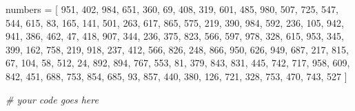 \documentclass[11pt]{article}
\newenvironment{Shaded}{}{}
\newcommand{\DecValTok}[1]{\textcolor[rgb]{0.25,0.63,0.44}{{#1}}}
\newcommand{\CommentTok}[1]{\textcolor[rgb]{0.38,0.63,0.69}{\textit{{#1}}}}
\newcommand{\NormalTok}[1]{{#1}}
\newcommand{\OperatorTok}[1]{\textcolor[rgb]{0.40,0.40,0.40}{{#1}}}
\begin{document}
\begin{Shaded}
\begin{Highlighting}[]

\NormalTok{numbers }\OperatorTok{=}\NormalTok{ [}
    \DecValTok{951}\NormalTok{, }\DecValTok{402}\NormalTok{, }\DecValTok{984}\NormalTok{, }\DecValTok{651}\NormalTok{, }\DecValTok{360}\NormalTok{, }\DecValTok{69}\NormalTok{, }\DecValTok{408}\NormalTok{, }\DecValTok{319}\NormalTok{, }\DecValTok{601}\NormalTok{, }\DecValTok{485}\NormalTok{, }\DecValTok{980}\NormalTok{, }\DecValTok{507}\NormalTok{, }\DecValTok{725}\NormalTok{, }\DecValTok{547}\NormalTok{, }\DecValTok{544}\NormalTok{,}
    \DecValTok{615}\NormalTok{, }\DecValTok{83}\NormalTok{, }\DecValTok{165}\NormalTok{, }\DecValTok{141}\NormalTok{, }\DecValTok{501}\NormalTok{, }\DecValTok{263}\NormalTok{, }\DecValTok{617}\NormalTok{, }\DecValTok{865}\NormalTok{, }\DecValTok{575}\NormalTok{, }\DecValTok{219}\NormalTok{, }\DecValTok{390}\NormalTok{, }\DecValTok{984}\NormalTok{, }\DecValTok{592}\NormalTok{, }\DecValTok{236}\NormalTok{, }\DecValTok{105}\NormalTok{, }\DecValTok{942}\NormalTok{, }\DecValTok{941}\NormalTok{,}
    \DecValTok{386}\NormalTok{, }\DecValTok{462}\NormalTok{, }\DecValTok{47}\NormalTok{, }\DecValTok{418}\NormalTok{, }\DecValTok{907}\NormalTok{, }\DecValTok{344}\NormalTok{, }\DecValTok{236}\NormalTok{, }\DecValTok{375}\NormalTok{, }\DecValTok{823}\NormalTok{, }\DecValTok{566}\NormalTok{, }\DecValTok{597}\NormalTok{, }\DecValTok{978}\NormalTok{, }\DecValTok{328}\NormalTok{, }\DecValTok{615}\NormalTok{, }\DecValTok{953}\NormalTok{, }\DecValTok{345}\NormalTok{,}
    \DecValTok{399}\NormalTok{, }\DecValTok{162}\NormalTok{, }\DecValTok{758}\NormalTok{, }\DecValTok{219}\NormalTok{, }\DecValTok{918}\NormalTok{, }\DecValTok{237}\NormalTok{, }\DecValTok{412}\NormalTok{, }\DecValTok{566}\NormalTok{, }\DecValTok{826}\NormalTok{, }\DecValTok{248}\NormalTok{, }\DecValTok{866}\NormalTok{, }\DecValTok{950}\NormalTok{, }\DecValTok{626}\NormalTok{, }\DecValTok{949}\NormalTok{, }\DecValTok{687}\NormalTok{, }\DecValTok{217}\NormalTok{,}
    \DecValTok{815}\NormalTok{, }\DecValTok{67}\NormalTok{, }\DecValTok{104}\NormalTok{, }\DecValTok{58}\NormalTok{, }\DecValTok{512}\NormalTok{, }\DecValTok{24}\NormalTok{, }\DecValTok{892}\NormalTok{, }\DecValTok{894}\NormalTok{, }\DecValTok{767}\NormalTok{, }\DecValTok{553}\NormalTok{, }\DecValTok{81}\NormalTok{, }\DecValTok{379}\NormalTok{, }\DecValTok{843}\NormalTok{, }\DecValTok{831}\NormalTok{, }\DecValTok{445}\NormalTok{, }\DecValTok{742}\NormalTok{, }\DecValTok{717}\NormalTok{,}
    \DecValTok{958}\NormalTok{, }\DecValTok{609}\NormalTok{, }\DecValTok{842}\NormalTok{, }\DecValTok{451}\NormalTok{, }\DecValTok{688}\NormalTok{, }\DecValTok{753}\NormalTok{, }\DecValTok{854}\NormalTok{, }\DecValTok{685}\NormalTok{, }\DecValTok{93}\NormalTok{, }\DecValTok{857}\NormalTok{, }\DecValTok{440}\NormalTok{, }\DecValTok{380}\NormalTok{, }\DecValTok{126}\NormalTok{, }\DecValTok{721}\NormalTok{, }\DecValTok{328}\NormalTok{, }\DecValTok{753}\NormalTok{, }\DecValTok{470}\NormalTok{,}
    \DecValTok{743}\NormalTok{, }\DecValTok{527}
\NormalTok{]}

\CommentTok{# your code goes here}
\end{Highlighting}
\end{Shaded}
\end{document}
